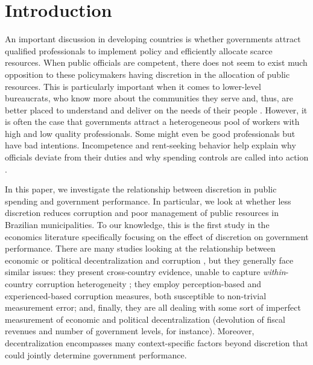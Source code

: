 \documentclass[11pt]{article}
\begin{document}
\section{Introduction} \label{sec:introduction}

An important discussion in developing countries is whether governments attract qualified professionals to implement policy and efficiently allocate scarce resources. When public officials are competent, there does not seem to exist much opposition to these policymakers having discretion in the allocation of public resources. This is particularly important when it comes to lower-level bureaucrats, who know more about the communities they serve and, thus, are better placed to understand and deliver on the needs of their people \citep{LipskyStreetLevelBureaucracy30th2010}. However, it is often the case that governments attract a heterogeneous pool of workers with high and low quality professionals. Some might even be good professionals but have bad intentions. Incompetence and rent-seeking behavior help explain why officials deviate from their duties and why spending controls are called into action \citep{LambsdorffCorruptionRentSeeking2002,OlkenCorruptionCostsRedistribution2006}.

In this paper, we investigate the relationship between discretion in public spending and government performance. In particular, we look at whether less discretion reduces corruption and poor management of public resources in Brazilian municipalities. To our knowledge, this is the first study in the economics literature specifically focusing on the effect of discretion on government performance. There are many studies looking at the relationship between economic or political decentralization and corruption \citep{Treismancausescorruptioncrossnational2000,FismanDecentralizationcorruptionevidence2002,FanPoliticaldecentralizationcorruption2009,ChoudhuryGovernmentaldecentralizationcorruption2015}, but they generally face similar issues: they present cross-country evidence, unable to capture \emph{within}-country corruption heterogeneity \citep{Treismancausescorruptioncrossnational2000,FismanDecentralizationcorruptionevidence2002}; they employ perception-based \citep{Treismancausescorruptioncrossnational2000,FismanDecentralizationcorruptionevidence2002} and experienced-based \citep{FanPoliticaldecentralizationcorruption2009,ChoudhuryGovernmentaldecentralizationcorruption2015} corruption measures,  both susceptible to non-trivial measurement error; and, finally, they are all dealing with some sort of imperfect measurement of economic and political decentralization (devolution of fiscal revenues and number of government levels, for instance). Moreover, decentralization encompasses many context-specific factors beyond discretion that could jointly determine government performance.
\end{document}
